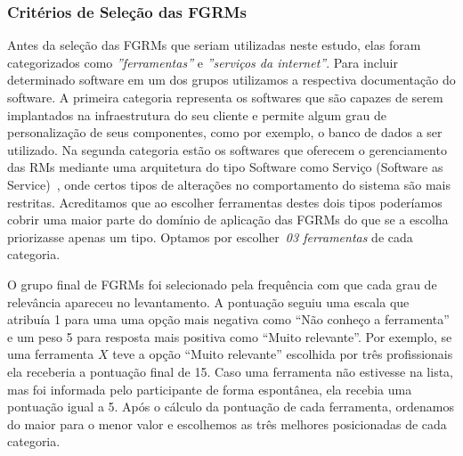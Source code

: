 \subsubsection{Critérios de Seleção das FGRMs}\label{ssub:metodologia_criterios_selecao}

Antes da seleção das FGRMs que seriam utilizadas neste estudo, elas foram
categorizados como \textit{''ferramentas''} e \textit{''serviços da
    internet''}.  Para incluir determinado software em um dos grupos utilizamos
a respectiva documentação do software. A primeira categoria representa os
softwares que são capazes de serem implantados na infraestrutura do seu cliente
e permite algum grau de personalização de seus componentes, como por exemplo, o
banco de dados a ser utilizado. Na segunda categoria estão os softwares que
oferecem o gerenciamento das RMs mediante uma arquitetura do tipo Software como
Serviço (Software as Service)~\cite{fox2013engineering}, onde certos tipos de
alterações no comportamento do sistema são mais restritas. Acreditamos que ao
escolher ferramentas destes dois tipos poderíamos cobrir uma maior parte do
domínio de aplicação das FGRMs do que se a escolha priorizasse apenas um tipo.
Optamos por escolher~\textit{03 ferramentas} de cada categoria.

O grupo final de FGRMs foi selecionado pela frequência com que cada grau de
relevância apareceu no levantamento. A pontuação seguiu uma escala que atribuía
1 para uma uma opção mais negativa como ``Não conheço a ferramenta'' e um peso 5
para resposta mais positiva como ``Muito relevante''.  Por exemplo, se uma
ferramenta $X$ teve a opção ``Muito relevante'' escolhida por três profissionais
ela receberia a pontuação final de 15. Caso uma ferramenta não estivesse na
lista, mas foi informada pelo participante de forma espontânea, ela recebia uma
pontuação igual a 5. Após o cálculo da pontuação de cada ferramenta, ordenamos
do maior para o menor valor e escolhemos as três melhores posicionadas de cada
categoria.


